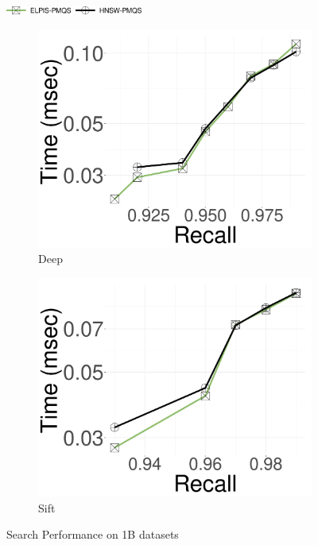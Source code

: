 	\begin{figure}
		\captionsetup{justification=centering}
		\captionsetup[subfigure]{justification=centering}
  \centering
   			\includegraphics[width=0.4\textwidth]{../img/elpis2/pre/legendpre.png}
  
  	\centering
		\begin{subfigure}{0.3\textwidth}
			\includegraphics[width=\textwidth]{../img/elpis2/1B/deep_Time.png}
			\caption{Deep}  
		\label{fig:elpis:query:performance:1B:deep:10NN}
		\end{subfigure}
  \hspace{0.4cm}
		\begin{subfigure}{0.3\textwidth}
			\includegraphics[width=\textwidth]{../img/elpis2/1B/sift_Time.png}
			\caption{Sift}  
			\label{fig:elpis:query:performance:1B:sift:10NN}
		\end{subfigure}
		\caption{{Search Performance on 1B datasets}}	
		\label{fig:elpis2:nleafsize:1B}
	\end{figure}




